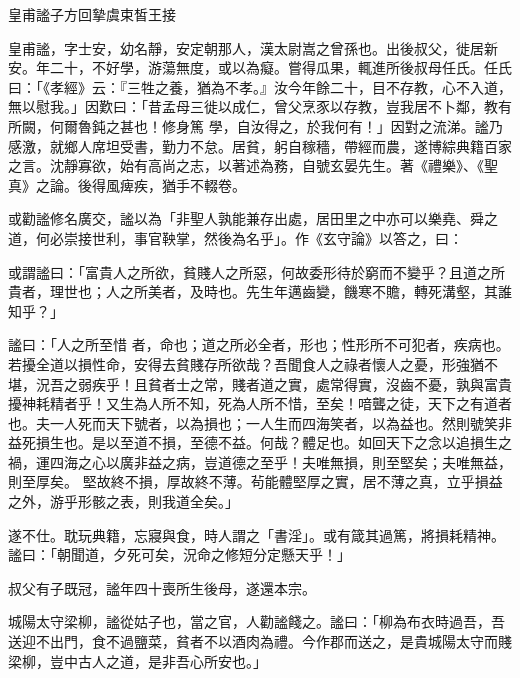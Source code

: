 
\begin{pinyinscope}

 皇甫謐子方回摯虞束皙王接



 皇甫謐，字士安，幼名靜，安定朝那人，漢太尉嵩之曾孫也。出後叔父，徙居新安。年二十，不好學，游蕩無度，或以為癡。嘗得瓜果，輒進所後叔母任氏。任氏曰：「《孝經》云：『三牲之養，猶為不孝。』汝今年餘二十，目不存教，心不入道，無以慰我。」因歎曰：「昔孟母三徙以成仁，曾父烹豕以存教，豈我居不卜鄰，教有所闕，何爾魯鈍之甚也！修身篤
 學，自汝得之，於我何有！」因對之流涕。謐乃感激，就鄉人席坦受書，勤力不怠。居貧，躬自稼穡，帶經而農，遂博綜典籍百家之言。沈靜寡欲，始有高尚之志，以著述為務，自號玄晏先生。著《禮樂》、《聖真》之論。後得風痺疾，猶手不輟卷。



 或勸謐修名廣交，謐以為「非聖人孰能兼存出處，居田里之中亦可以樂堯、舜之道，何必崇接世利，事官鞅掌，然後為名乎」。作《玄守論》以答之，曰：



 或謂謐曰：「富貴人之所欲，貧賤人之所惡，何故委形待於窮而不變乎？且道之所貴者，理世也；人之所美者，及時也。先生年邁齒變，饑寒不贍，轉死溝壑，其誰知乎？」



 謐曰：「人之所至惜
 者，命也；道之所必全者，形也；性形所不可犯者，疾病也。若擾全道以損性命，安得去貧賤存所欲哉？吾聞食人之祿者懷人之憂，形強猶不堪，況吾之弱疾乎！且貧者士之常，賤者道之實，處常得實，沒齒不憂，孰與富貴擾神耗精者乎！又生為人所不知，死為人所不惜，至矣！喑聾之徒，天下之有道者也。夫一人死而天下號者，以為損也；一人生而四海笑者，以為益也。然則號笑非益死損生也。是以至道不損，至德不益。何哉？體足也。如回天下之念以追損生之禍，運四海之心以廣非益之病，豈道德之至乎！夫唯無損，則至堅矣；夫唯無益，則至厚矣。
 堅故終不損，厚故終不薄。茍能體堅厚之實，居不薄之真，立乎損益之外，游乎形骸之表，則我道全矣。」



 遂不仕。耽玩典籍，忘寢與食，時人謂之「書淫」。或有箴其過篤，將損耗精神。謐曰：「朝聞道，夕死可矣，況命之修短分定懸天乎！」



 叔父有子既冠，謐年四十喪所生後母，遂還本宗。



 城陽太守梁柳，謐從姑子也，當之官，人勸謐餞之。謐曰：「柳為布衣時過吾，吾送迎不出門，食不過鹽菜，貧者不以酒肉為禮。今作郡而送之，是貴城陽太守而賤梁柳，豈中古人之道，是非吾心所安也。」




\end{pinyinscope}
